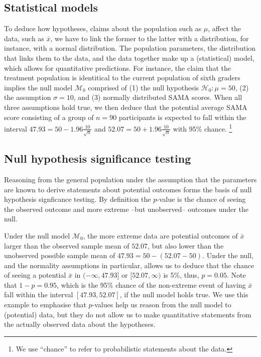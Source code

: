 \documentclass[english,,doc,floatsintext]{apa6}
\let\rmarkdownfootnote\footnote%
\def\footnote{\protect\rmarkdownfootnote}
\begin{document}
\subsection{Statistical models}

To deduce how hypotheses, claims about the population such as \(\mu\), affect the data, such as \(\bar{x}\), we have to link the former to the latter with a distribution, for instance, with a normal distribution. The population parameters, the distribution that links them to the data, and the data together make up a (statistical) model, which allows for quantitative predictions. For instance, the claim that the treatment population is identitical to the current population of sixth graders implies the null model \(\mathcal{M}_{0}\) comprised of (1) the null hypothesis \(\mathcal{H}_{0}: \mu = 50\), (2) the assumption \(\sigma = 10\), and (3) normally distributed SAMA scores. When all three assumptions hold true, we then deduce that the potential average SAMA score consisting of a group of \(n = 90\) participants is expected to fall within the interval \(47.93 = 50 - 1.96 \frac{10}{\sqrt{n}}\) and \(52.07 = 50 + 1.96 \frac{10}{\sqrt{n}}\) with 95\% chance.
\footnote{We use ``chance'' to refer to probabilistic statements about the data.}

\subsection{Null hypothesis significance testing}

Reasoning from the general population under the assumption that the parameters are known to derive statements about potential outcomes forms the basis of null hypothesis signficance testing. By definition the \(p\)-value is the chance of seeing the observed outcome and more extreme --but unobserved-- outcomes under the null.

Under the null model \(\mathcal{M}_{0}\), the more extreme data are potential outcomes of \(\bar{x}\) larger than the observed sample mean of \(52.07\), but also lower than the unobserved possible sample mean of \(47.93 = 50 - (52.07-50)\). Under the null, and the normality assumptions in particular, allows us to deduce that the chance of seeing a potential \(\bar{x}\) in \((- \infty, 47.93]\) or \([52.07, \infty)\) is 5\%, thus, \(p=0.05\). Note that \(1 - p = 0.95\), which is the 95\% chance of the non-extreme event of having \(\bar{x}\) fall within the interval \([47.93, 52.07]\), if the null model holds true. We use this example to emphasise that \(p\)-values help us reason from the null model to (potential) data, but they do not allow us to make quantitative statements from the actually observed data about the hypotheses.
\end{document}
